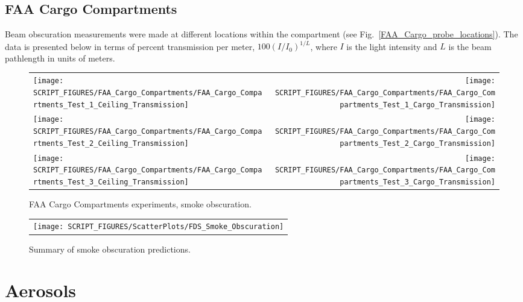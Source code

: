 \clearpage

\subsection{FAA Cargo Compartments}
\label{Smoke Obscuration}

Beam obscuration measurements were made at different locations within the compartment (see Fig.~\ref{FAA_Cargo_probe_locations}). The data is presented below in terms of percent transmission per meter, $100(I/I_0)^{1/L}$, where $I$ is the light intensity and $L$ is the beam pathlength in units of meters.

\begin{figure}[h]
\begin{tabular*}{\textwidth}{l@{\extracolsep{\fill}}r}
\texttt{[image: SCRIPT\_FIGURES/FAA\_Cargo\_Compartments/FAA\_Cargo\_Compartments\_Test\_1\_Ceiling\_Transmission]} &
\texttt{[image: SCRIPT\_FIGURES/FAA\_Cargo\_Compartments/FAA\_Cargo\_Compartments\_Test\_1\_Cargo\_Transmission]} \\
\texttt{[image: SCRIPT\_FIGURES/FAA\_Cargo\_Compartments/FAA\_Cargo\_Compartments\_Test\_2\_Ceiling\_Transmission]} &
\texttt{[image: SCRIPT\_FIGURES/FAA\_Cargo\_Compartments/FAA\_Cargo\_Compartments\_Test\_2\_Cargo\_Transmission]} \\
\texttt{[image: SCRIPT\_FIGURES/FAA\_Cargo\_Compartments/FAA\_Cargo\_Compartments\_Test\_3\_Ceiling\_Transmission]} &
\texttt{[image: SCRIPT\_FIGURES/FAA\_Cargo\_Compartments/FAA\_Cargo\_Compartments\_Test\_3\_Cargo\_Transmission]}
\end{tabular*}
\caption{FAA Cargo Compartments experiments, smoke obscuration.}
\end{figure}

\newpage

\begin{figure}[p]
\begin{center}
\begin{tabular}{c}
\texttt{[image: SCRIPT\_FIGURES/ScatterPlots/FDS\_Smoke\_Obscuration]}
\end{tabular}
\end{center}
\caption[Summary of smoke obscuration predictions]{Summary of smoke obscuration predictions.}
\end{figure}


\clearpage

\section{Aerosols}

